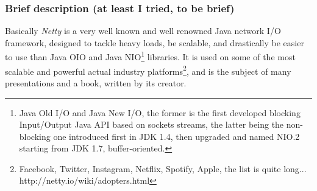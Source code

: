 \documentclass[a4paper]{report}
\begin{document}
\subsubsection{Brief description (at least I tried, to be brief)}
Basically \emph{Netty} is a very well known and well renowned Java network I/O framework, designed to  tackle heavy loads, be scalable, and drastically be easier to use than Java OIO and Java NIO\footnote{Java Old I/O and Java New I/O, the former is the first developed blocking Input/Output Java API based on sockets streams, the latter being the non-blocking one introduced first in JDK 1.4, then upgraded and named NIO.2 starting from JDK 1.7, buffer-oriented.} libraries. It is used on some of the most scalable and powerful actual industry platforms\footnote{Facebook, Twitter, Instagram, Netflix, Spotify, Apple, the list is quite long... http://netty.io/wiki/adopters.html}, and is the subject of many presentations and a book, written by its creator.\\
\end{document}
